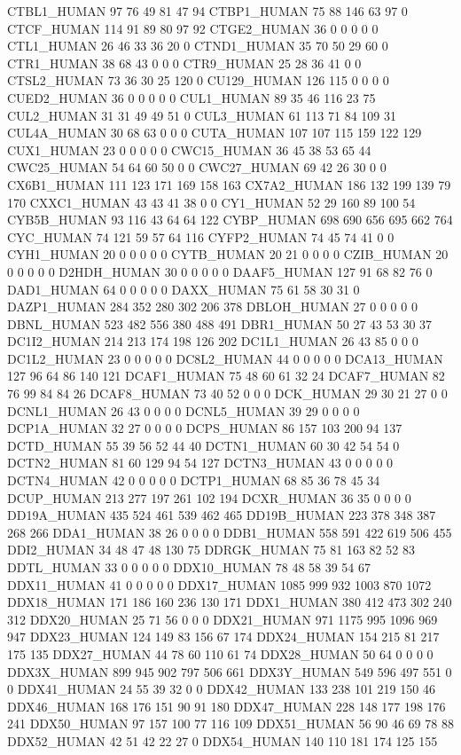CTBL1_HUMAN	97	76	49	81	47	94
CTBP1_HUMAN	75	88	146	63	97	0
CTCF_HUMAN	114	91	89	80	97	92
CTGE2_HUMAN	36	0	0	0	0	0
CTL1_HUMAN	26	46	33	36	20	0
CTND1_HUMAN	35	70	50	29	60	0
CTR1_HUMAN	38	68	43	0	0	0
CTR9_HUMAN	25	28	36	41	0	0
CTSL2_HUMAN	73	36	30	25	120	0
CU129_HUMAN	126	115	0	0	0	0
CUED2_HUMAN	36	0	0	0	0	0
CUL1_HUMAN	89	35	46	116	23	75
CUL2_HUMAN	31	31	49	49	51	0
CUL3_HUMAN	61	113	71	84	109	31
CUL4A_HUMAN	30	68	63	0	0	0
CUTA_HUMAN	107	107	115	159	122	129
CUX1_HUMAN	23	0	0	0	0	0
CWC15_HUMAN	36	45	38	53	65	44
CWC25_HUMAN	54	64	60	50	0	0
CWC27_HUMAN	69	42	26	30	0	0
CX6B1_HUMAN	111	123	171	169	158	163
CX7A2_HUMAN	186	132	199	139	79	170
CXXC1_HUMAN	43	43	41	38	0	0
CY1_HUMAN	52	29	160	89	100	54
CYB5B_HUMAN	93	116	43	64	64	122
CYBP_HUMAN	698	690	656	695	662	764
CYC_HUMAN	74	121	59	57	64	116
CYFP2_HUMAN	74	45	74	41	0	0
CYH1_HUMAN	20	0	0	0	0	0
CYTB_HUMAN	20	21	0	0	0	0
CZIB_HUMAN	20	0	0	0	0	0
D2HDH_HUMAN	30	0	0	0	0	0
DAAF5_HUMAN	127	91	68	82	76	0
DAD1_HUMAN	64	0	0	0	0	0
DAXX_HUMAN	75	61	58	30	31	0
DAZP1_HUMAN	284	352	280	302	206	378
DBLOH_HUMAN	27	0	0	0	0	0
DBNL_HUMAN	523	482	556	380	488	491
DBR1_HUMAN	50	27	43	53	30	37
DC1I2_HUMAN	214	213	174	198	126	202
DC1L1_HUMAN	26	43	85	0	0	0
DC1L2_HUMAN	23	0	0	0	0	0
DC8L2_HUMAN	44	0	0	0	0	0
DCA13_HUMAN	127	96	64	86	140	121
DCAF1_HUMAN	75	48	60	61	32	24
DCAF7_HUMAN	82	76	99	84	84	26
DCAF8_HUMAN	73	40	52	0	0	0
DCK_HUMAN	29	30	21	27	0	0
DCNL1_HUMAN	26	43	0	0	0	0
DCNL5_HUMAN	39	29	0	0	0	0
DCP1A_HUMAN	32	27	0	0	0	0
DCPS_HUMAN	86	157	103	200	94	137
DCTD_HUMAN	55	39	56	52	44	40
DCTN1_HUMAN	60	30	42	54	54	0
DCTN2_HUMAN	81	60	129	94	54	127
DCTN3_HUMAN	43	0	0	0	0	0
DCTN4_HUMAN	42	0	0	0	0	0
DCTP1_HUMAN	68	85	36	78	45	34
DCUP_HUMAN	213	277	197	261	102	194
DCXR_HUMAN	36	35	0	0	0	0
DD19A_HUMAN	435	524	461	539	462	465
DD19B_HUMAN	223	378	348	387	268	266
DDA1_HUMAN	38	26	0	0	0	0
DDB1_HUMAN	558	591	422	619	506	455
DDI2_HUMAN	34	48	47	48	130	75
DDRGK_HUMAN	75	81	163	82	52	83
DDTL_HUMAN	33	0	0	0	0	0
DDX10_HUMAN	78	48	58	39	54	67
DDX11_HUMAN	41	0	0	0	0	0
DDX17_HUMAN	1085	999	932	1003	870	1072
DDX18_HUMAN	171	186	160	236	130	171
DDX1_HUMAN	380	412	473	302	240	312
DDX20_HUMAN	25	71	56	0	0	0
DDX21_HUMAN	971	1175	995	1096	969	947
DDX23_HUMAN	124	149	83	156	67	174
DDX24_HUMAN	154	215	81	217	175	135
DDX27_HUMAN	44	78	60	110	61	74
DDX28_HUMAN	50	64	0	0	0	0
DDX3X_HUMAN	899	945	902	797	506	661
DDX3Y_HUMAN	549	596	497	551	0	0
DDX41_HUMAN	24	55	39	32	0	0
DDX42_HUMAN	133	238	101	219	150	46
DDX46_HUMAN	168	176	151	90	91	180
DDX47_HUMAN	228	148	177	198	176	241
DDX50_HUMAN	97	157	100	77	116	109
DDX51_HUMAN	56	90	46	69	78	88
DDX52_HUMAN	42	51	42	22	27	0
DDX54_HUMAN	140	110	181	174	125	155
